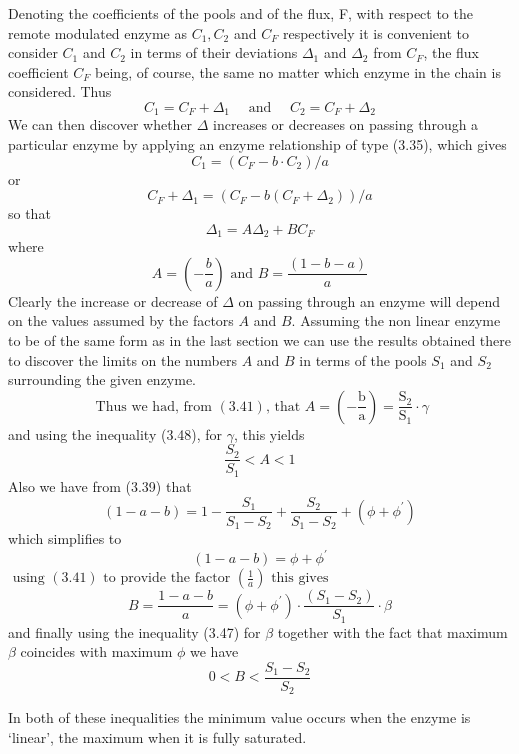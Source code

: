 Denoting the coefficients of the pools and of the flux, F, with respect to the remote modulated enzyme as $C_{1}, C_{2}$ and $C_{F}$ respectively it is convenient to consider $C_{1}$ and $C_{2}$ in terms of their deviations $\Delta_{1}$ and $\Delta_{2}$ from $C_{F}$, the flux coefficient $C_{F}$ being, of course, the same no matter which enzyme in the chain is considered. Thus
%
$$
C_{1} = C_{F}+\Delta_{1} \quad \text { and } \quad C_{2}=C_{F} + \Delta_{2}
$$
%
We can then discover whether $\Delta$ increases or decreases on passing through a particular enzyme by applying an enzyme relationship of type (3.35), which gives
%
$$
C_1 = \left(C_F - b \cdot C_2\right) / a
$$
or
%
$$ C_F+\Delta_1 = \left(C_F-b\left(C_F+\Delta_2\right)\right) / a $$
%
so that
%
\begin{equation}
\Delta_1 = A \Delta_2 + B C_F
\label{eqn:349}
\end{equation}
%
where
%
$$
A = \left(-\frac{b}{a}\right) \text { and } B=\frac{(1-b-a)}{a}
$$
%
Clearly the increase or decrease of $\Delta$ on passing through an enzyme will depend on the values assumed by the factors $A$ and $B$. Assuming the non linear enzyme to be of the same form as in the last section we can use the results obtained there to discover the limits on the numbers $A$ and $B$ in terms of the pools $S_{1}$ and $S_{2}$ surrounding the given enzyme.
%
$$
\text { Thus we had, from }(3.41) \text {, that } A=\left(-\frac{\mathrm{b}}{\mathrm{a}}\right)=\frac{\mathrm{S}_{2}}{\mathrm{S}_{1}} \cdot \gamma
$$
%
and using the inequality (3.48), for $\gamma$, this yields
%
\begin{equation}
\frac{S_{2}}{S_{1}} < A < 1
\label{eqn:350}
\end{equation}
%
Also we have from (3.39) that
%
$$
(1-a-b)=1-\frac{S_{1}}{S_{1}-S_{2}}+\frac{S_{2}}{S_{1}-S_{2}}+\left(\phi+\phi^{\prime}\right) $$
%
which simplifies to
%
$$
(1-a-b) = \phi + \phi^{\prime}
$$
%
$ \displaystyle \text { using }(3.41) \text { to provide the factor }\left(\frac{1}{a}\right) \text { this gives } $
%
$$
B = \frac{1-a-b}{a}=\left(\phi+\phi^{\prime}\right) \cdot \frac{\left(S_{1}-S_{2}\right)}{S_{1}} \cdot \beta
$$
%
and finally using the inequality (3.47) for $\beta$ together with the fact that maximum $\beta$ coincides with maximum $\phi$ we have
%
\begin{equation}
0 < B < \frac{S_{1}-S_{2}}{S_{2}}
\label{eqn:351}
\end{equation}

In both of these inequalities the minimum value occurs when the enzyme is `linear', the maximum when it is fully saturated.

